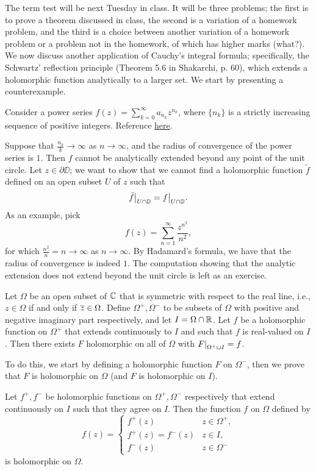 \noindent The term test will be next Tuesday in class. It will be three problems; the first is to prove a theorem discussed in class, the second is a variation of a homework problem, and the third is a choice between another variation of a homework problem or a problem not in the homework, of which has higher marks (what?).
\newpage
\noindent We now discuss another application of Cauchy's integral formula; specifically, the Schwartz' reflection principle (Theorem 5.6 in Shakarchi, p. 60), which extends a holomorphic function analytically to a larger set. We start by presenting a counterexample.
\begin{theorem}
    Consider a power series $f(z) = \sum_{k=0}^\infty a_{n_k} z^{n_k}$, where $\{n_k\}$ is a strictly increasing sequence of positive integers. Reference \href{https://en.wikipedia.org/wiki/Fabry_gap_theorem}{here}.
\end{theorem}
\noindent Suppose that $\frac{n_k}{k} \to \infty$ as $n \to \infty$, and the radius of convergence of the power series is $1$. Then $f$ cannot be analytically extended beyond any point of the unit circle. Let $z \in \partial \DD$; we want to show that we cannot find a holomorphic function $\tilde{f}$ defined on an open subset $U$ of $z$ such that
\[ \restr{\tilde f}{U \cap \DD} = \restr{f}{U \cap \DD}. \]
As an example, pick
\[ f(z) = \sum_{n=1}^\infty \frac{z^{n^2}}{n^2}, \]
for which $\frac{n^2}{n} = n \to \infty$ as $n \to \infty$. By Hadamard's formula, we have that the radius of convergence is indeed $1$. The computation showing that the analytic extension does not extend beyond the unit circle is left as an exercise.
\begin{theorem}
    Let $\Omega$ be an open subset of $\mathbb C$ that is symmetric with respect to the real line, i.e., $z \in \Omega$ if and only if $\overline z \in \Omega$. Define $\Omega^+, \Omega^-$ to be subsets of $\Omega$ with positive and negative imaginary part respectively, and let $I = \Omega \cap \mathbb R$. Let $f$ be a holomorphic function on $\Omega^+$ that extends continuously to $I$ and such that $f$ is real-valued on $I$. Then there exists $F$ holomorphic on all of $\Omega$ with $\restr{F}{\Omega^+ \sqcup I} = f$.
\end{theorem}
\noindent To do this, we start by defining a holomorphic function $F$ on $\Omega^-$, then we prove that $F$ is holomorphic on $\Omega$ (and $F$ is holomorphic on $I$).
\begin{theorem}
    Let $f^+, f^-$ be holomorphic functions on $\Omega^+, \Omega^-$ respectively that extend continuously on $I$ such that they agree on $I$. Then the function $f$ on $\Omega$ defined by
    \[ f(z) = \begin{cases} f^+(z) &z \in \Omega^+, \\ f^+(z) = f^-(z) &z \in I, \\ f^-(z) &z \in \Omega^- \end{cases} \]
    is holomorphic on $\Omega$.
\end{theorem}
